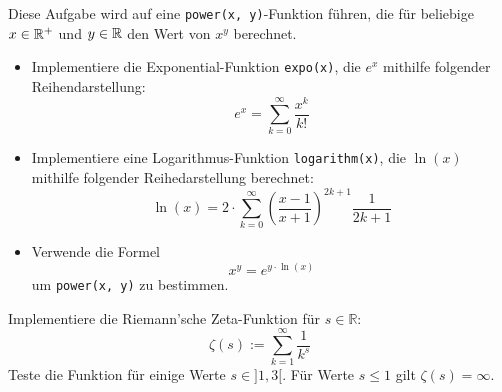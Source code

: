 \documentclass{uebungszettel}
\begin{document}
\begin{aufg}
Diese Aufgabe wird auf eine \verb|power(x, y)|-Funktion führen, die für beliebige $x \in \mathbb{R}^+$ und $y \in \mathbb{R}$ den Wert von $x^y$ berechnet.
\begin{itemize}
\item Implementiere die Exponential-Funktion \verb|expo(x)|, die $e^x$ mithilfe folgender Reihendarstellung: \[
e^x = \sum_{k=0}^\infty \frac{x^k}{k!} \]
\item Implementiere eine Logarithmus-Funktion \verb|logarithm(x)|, die $\ln(x)$ mithilfe folgender Reihedarstellung berechnet: \[
\ln(x) = 2\cdot \sum_{k = 0}^\infty \left(\frac{x-1}{x+1}\right)^{2k + 1} \frac{1}{2k + 1} \]
\item Verwende die Formel \[
x^y = e^{y \cdot \ln(x)} \] um \verb|power(x, y)| zu bestimmen.
\end{itemize}
\end{aufg}

\begin{aufg}
Implementiere die Riemann'sche Zeta-Funktion für $s \in \mathbb R$: $$
\zeta(s) := \sum_{k=1}^\infty \frac{1}{k^s} $$
Teste die Funktion für einige Werte $s \in ] 1, 3 [$. Für Werte $s \leq 1$
gilt $\zeta(s) = \infty$.
\end{aufg}
\end{document}
